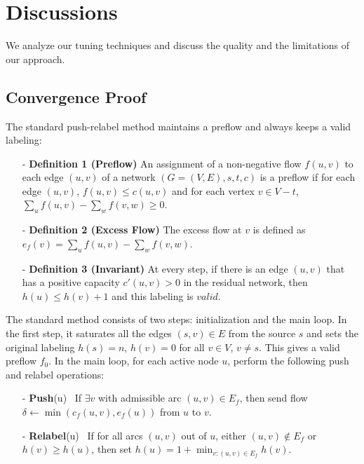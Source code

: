 
\section{Discussions}
\label{section discussions}

We analyze our tuning techniques and discuss the quality and the limitations of our approach.

\subsection{\textbf{Convergence Proof}}

The standard push-relabel method \cite{88GT} maintains a preflow and always keeps a valid labeling:

\begin{itemize}
\item[-] \textbf{Definition 1 (Preflow)} An assignment of a non-negative flow $f(u, v)$ to each edge $(u, v)$ of a network $(G = (V, E), s, t, c)$ is a preflow if for each edge $(u, v)$, $f(u, v) \le c(u, v)$ and for each vertex $v \in V - {t}$, $\sum_{u}f(u, v) - \sum_{w}f(v, w) \ge 0$.
\item[-] \textbf{Definition 2 (Excess Flow)} The excess flow at $v$ is defined as $e_f(v) = \sum_{u}f(u, v) - \sum_{w}f(v, w)$.
\item[-] \textbf{Definition 3 (Invariant)} At every step, if there is an edge $(u, v)$ that has a positive capacity $c'(u, v) > 0$ in the residual network, then $h(u) \le h(v) + 1$ and this labeling is $valid$.
\end{itemize}

The standard method consists of two steps: initialization and the main loop.
In the first step, it saturates all the edges $(s, v) \in E$ from the source $s$ and sets the original labeling $h(s) = n$, $h(v) = 0$ for all $v \in V$, $v \ne s$.
This gives a valid preflow $f_0$.
In the main loop, for each active node $u$, perform the following push and relabel operations:

\begin{itemize}
\item[-] \textbf{Push}(u) \  If $\exists v$ with admissible arc $(u, v) \in E_f$, then send flow $\delta \gets \min(c_f(u, v), e_f(u))$ from $u$ to $v$.
\item[-] \textbf{Relabel}(u) \  If for all arcs $(u, v)$ out of $u$, either $(u, v) \notin E_f$ or $h(v) \ge h(u)$, then set $h(u) = 1 + \min_{v:(u,v) \in E_f} h(v)$.
\end{itemize}

